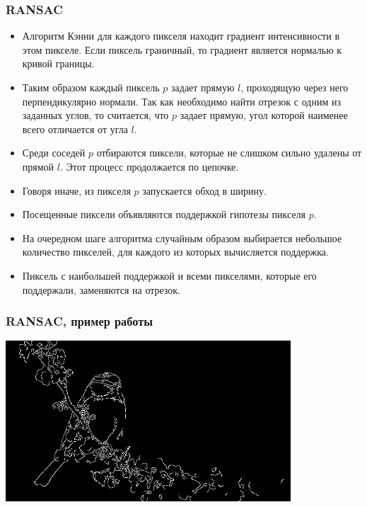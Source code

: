 \begin{frame}\frametitle{RANSAC}
    \begin{itemize}
        \item Алгоритм Кэнни для каждого пикселя находит градиент интенсивности в этом пикселе.
        Если пиксель граничный, то градиент является нормалью к кривой границы.
        \pause
        \item Таким образом каждый пиксель $p$ задает прямую $l$, проходящую через него перпендикулярно нормали.
        Так как необходимо найти отрезок с одним из заданных углов, то считается, что $p$ задает прямую, угол которой
        наименее всего отличается от угла $l$.
        \pause
        \item Среди соседей $p$ отбираются пиксели, которые не слишком сильно
        удалены от прямой $l$. Этот процесс продолжается по цепочке.
        \pause
        \item Говоря иначе, из пикселя $p$ запускается обход в ширину.
        \pause
        \item Посещенные пиксели объявляются поддержкой гипотезы пикселя $p$.
        \pause
        \item На очередном шаге алгоритма случайным образом выбирается небольшое
        количество пикселей, для каждого из которых вычисляется поддержка.
        \pause
        \item Пиксель с наибольшей поддержкой и всеми пикселями, которые его поддержали, заменяются на отрезок.
    \end{itemize}
\end{frame}

\begin{frame}\frametitle{RANSAC, пример работы}
    \begin{center}
        \includegraphics[height=6cm]{veselov_imgs/edge_map3.jpg}
    \end{center}
\end{frame}

